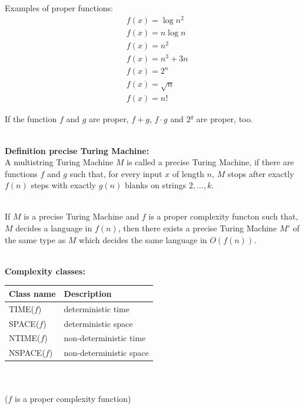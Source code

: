 \documentclass[a4]{scrartcl}
\begin{document}
Examples of proper functions: \cite{book} 
\begin{align*}
\ & f(x) = \log n^2 \\
\ & f(x) = n \log n \\
\ & f(x) = n^2 \\
\ & f(x) = n^3 +3n \\
\ & f(x) = 2^n \\
\ & f(x) = \sqrt{n} \\
\ & f(x) = n!
\end{align*}

If the function $f$ and $g$ are proper, $f+g$, $f \cdot g$ and $2^g$ are proper, too.

\ \\
\textbf{Definition precise Turing Machine:} \cite{book, CC} \\
A multistring Turing Machine $M$ is called a precise Turing Machine, if there are functions $f$ and $g$ such that, for every input $x$ of length $n$, $M$ stops after exactly $f(n)$ steps with exactly $g(n)$ blanks on strings $2, . . . , k$.

\ \\
If $M$ is a precise Turing Machine and $f$ is a proper complexity functon such that, $M$ decides a language in $f(n)$, then there exists a precise Turing Machine $M'$ of the same type as $M$ which decides the same language in $O(f(n))$.


\ \\
\textbf{Complexity classes:} \cite{book, CC} \\

\begin{tabular}{l|l}
Class name & Description \\
\hline
TIME($f$) & deterministic time \\
SPACE($f$) & deterministic space \\
NTIME($f$) & non-deterministic time \\
NSPACE($f$) & non-deterministic space \\
\end{tabular}
\ \\ \\
($f$ is a proper complexity function) 
\end{document}
